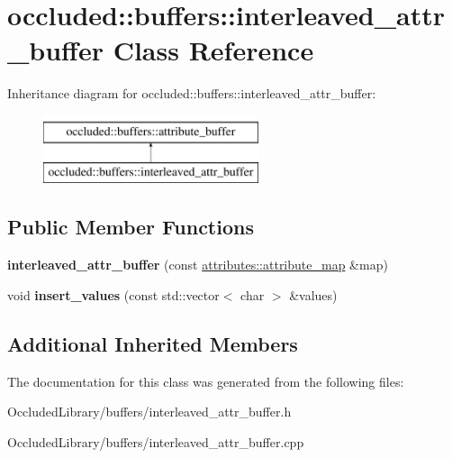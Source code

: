 \hypertarget{classoccluded_1_1buffers_1_1interleaved__attr__buffer}{\section{occluded\+:\+:buffers\+:\+:interleaved\+\_\+attr\+\_\+buffer Class Reference}
\label{classoccluded_1_1buffers_1_1interleaved__attr__buffer}
}
Inheritance diagram for occluded\+:\+:buffers\+:\+:interleaved\+\_\+attr\+\_\+buffer\+:\begin{figure}[H]
\begin{center}
\leavevmode
\includegraphics[height=2.000000cm]{classoccluded_1_1buffers_1_1interleaved__attr__buffer}
\end{center}
\end{figure}
\subsection*{Public Member Functions}
\begin{DoxyCompactItemize}
\item 
\hypertarget{classoccluded_1_1buffers_1_1interleaved__attr__buffer_af40be210a1b5468d1696e1cb1e9f663b}{{\bfseries interleaved\+\_\+attr\+\_\+buffer} (const \hyperlink{classoccluded_1_1buffers_1_1attributes_1_1attribute__map}{attributes\+::attribute\+\_\+map} \&map)}\label{classoccluded_1_1buffers_1_1interleaved__attr__buffer_af40be210a1b5468d1696e1cb1e9f663b}

\item 
\hypertarget{classoccluded_1_1buffers_1_1interleaved__attr__buffer_a719550fc8a8afb80d5770b4b8c5bbc47}{void {\bfseries insert\+\_\+values} (const std\+::vector$<$ char $>$ \&values)}\label{classoccluded_1_1buffers_1_1interleaved__attr__buffer_a719550fc8a8afb80d5770b4b8c5bbc47}

\end{DoxyCompactItemize}
\subsection*{Additional Inherited Members}


The documentation for this class was generated from the following files\+:\begin{DoxyCompactItemize}
\item 
Occluded\+Library/buffers/interleaved\+\_\+attr\+\_\+buffer.\+h\item 
Occluded\+Library/buffers/interleaved\+\_\+attr\+\_\+buffer.\+cpp\end{DoxyCompactItemize}
